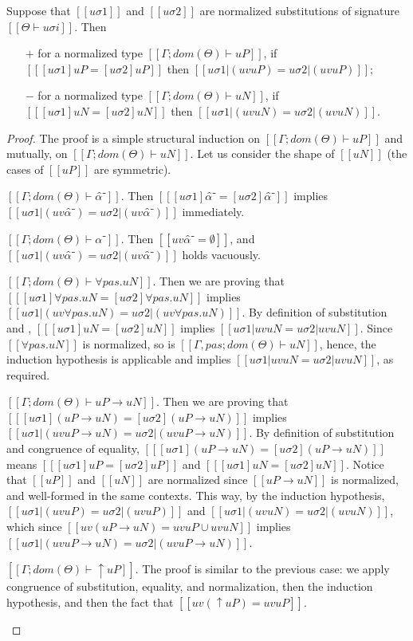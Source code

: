 \begin{lemma}
  \label{lemma:subst-eq-metavar}
  Suppose that $[[uσ1]]$ and $[[uσ2]]$ are 
  normalized substitutions of signature $[[Θ ⊢ uσi]]$.
  Then 
  \begin{enumerate}
    \item [$+$] for a normalized type $[[Γ; dom(Θ) ⊢ uP]]$, if $[[ [uσ1]uP = [uσ2]uP ]]$ then
      $[[uσ1|(uv uP)  = uσ2|(uv uP)]]$;
    \item [$-$] for a normalized type $[[Γ; dom(Θ) ⊢ uN]]$, if $[[ [uσ1]uN = [uσ2]uN ]]$ then
      $[[uσ1|(uv uN)  = uσ2|(uv uN)]]$.
  \end{enumerate}
\end{lemma}
\begin{proof}
  The proof is a simple structural induction on 
  $[[Γ; dom(Θ) ⊢ uP]]$ and mutually, on $[[Γ; dom(Θ) ⊢ uN]]$.
  Let us consider the shape of $[[uN]]$ (the cases of $[[uP]]$ are symmetric).
  \begin{caseof}
    \item $[[Γ; dom(Θ) ⊢ α̂⁻]]$. Then $[[ [uσ1]α̂⁻ = [uσ2]α̂⁻ ]]$
      implies $[[uσ1|(uv α̂⁻) = uσ2|(uv α̂⁻)]]$ immediately.
    \item $[[Γ; dom(Θ) ⊢ α⁻]]$. Then $[[uv α̂⁻ = ∅]]$, and
      $[[uσ1|(uv α̂⁻)  = uσ2|(uv α̂⁻)]]$ holds vacuously.
    \item $[[Γ; dom(Θ) ⊢ ∀pas.uN]]$. Then we are proving that
      $[[ [uσ1]∀pas.uN = [uσ2]∀pas.uN ]]$ implies $[[uσ1|(uv ∀pas.uN) = uσ2|(uv ∀pas.uN)]]$.
      By definition of substitution and , 
      $[[ [uσ1]uN = [uσ2]uN ]]$ implies $[[uσ1|uv uN = uσ2|uv uN]]$.
      Since $[[∀pas.uN]]$ is normalized, so is $[[Γ, pas; dom(Θ) ⊢ uN]]$, 
      hence, the induction hypothesis is applicable and implies $[[uσ1|uv uN = uσ2|uv uN]]$,
      as required.
    \item $[[Γ; dom(Θ) ⊢ uP → uN]]$. Then we are proving that
      $[[ [uσ1](uP → uN) = [uσ2](uP → uN) ]]$ implies $[[uσ1|(uv uP → uN) = uσ2|(uv uP → uN)]]$.
      By definition of substitution and congruence of equality, 
      $[[ [uσ1](uP → uN) = [uσ2](uP → uN) ]]$
      means $[[ [uσ1]uP = [uσ2]uP ]]$ and $[[ [uσ1]uN = [uσ2]uN ]]$.
      Notice that $[[uP]]$ and $[[uN]]$ are normalized since $[[uP → uN]]$ is normalized, 
      and well-formed in the same contexts.
      This way, by the induction hypothesis, 
      $[[uσ1|(uv uP) = uσ2|(uv uP)]]$ and $[[uσ1|(uv uN) = uσ2|(uv uN)]]$,
      which since $[[uv (uP → uN) = uv uP ∪ uv uN]]$ implies
      $[[uσ1|(uv uP → uN) = uσ2|(uv uP → uN)]]$.
    \item $[[Γ; dom(Θ) ⊢ ↑uP]]$. The proof is similar to the previous case:
      we apply congruence of substitution, equality, and normalization,
      then the induction hypothesis, and then the fact that $[[uv (↑uP) = uv uP]]$.
  \end{caseof}
\end{proof}



